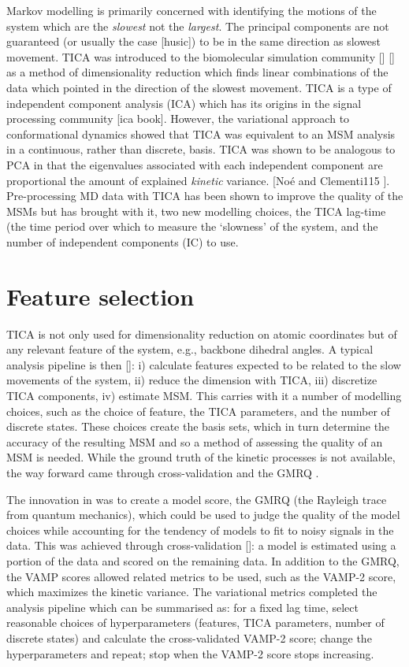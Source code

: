 Markov modelling is primarily concerned with identifying the motions of the system which are the \emph{slowest} not the \emph{largest}. The principal components are not guaranteed (or usually the case [husic]) to be in the same direction as slowest movement. TICA was introduced to the biomolecular simulation community [] [] as a method of dimensionality reduction which finds linear combinations of the data which pointed in the direction of the slowest movement. TICA is a type of independent component analysis (ICA) which has its origins in the signal processing community [ica book]. However, the variational approach to conformational dynamics showed that TICA was equivalent to an MSM analysis in a continuous, rather than discrete, basis. TICA was shown to be analogous to PCA in that the eigenvalues associated with each independent component are proportional the amount of explained \emph{kinetic} variance. [Noé and Clementi115 ]. Pre-processing MD data with TICA has been shown to improve the quality of the MSMs but has brought with it, two new modelling choices, the TICA lag-time (the time period over which to measure the `slowness' of the system, and the number of independent components (IC) to use. 

\section{Feature selection}
TICA is not only used for dimensionality reduction on atomic coordinates but of any relevant feature of the system, e.g.,  backbone dihedral angles. A typical analysis pipeline is then []: i) calculate features expected to be related to the slow movements of the system, ii) reduce the dimension with TICA, iii) discretize TICA components, iv) estimate MSM. This carries with it a number of modelling choices, such as the choice of feature, the TICA parameters, and the number of discrete states. These choices create the basis sets, which in turn determine the accuracy of the resulting MSM and so a method of assessing the quality of an MSM is needed. While the ground truth of the kinetic processes is not available, the way forward came through cross-validation and the GMRQ \cite{mcgibbonVariationalCrossvalidationSlow2015}. 

The innovation in \cite{mcgibbonVariationalCrossvalidationSlow2015} was to create a model score, the GMRQ (the Rayleigh trace from quantum mechanics), which could be used to judge the quality of the model choices while accounting for the tendency of models to fit to noisy signals in the data. This was achieved through cross-validation []: a model is estimated using a portion of the data and scored on the remaining data. In addition to the GMRQ, the VAMP scores allowed related metrics to be used, such as the VAMP-2 score, which maximizes the kinetic variance. The variational metrics completed the analysis pipeline \cite{schererVariationalSelectionFeatures2019} which can be summarised as: for a fixed lag time, select reasonable choices of  hyperparameters (features, TICA parameters, number of discrete states) and calculate the cross-validated VAMP-2 score; change the hyperparameters and repeat; stop when the VAMP-2 score stops increasing. 

